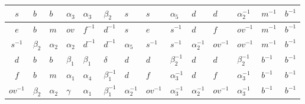 \documentclass{llncs}
\begin{document}
\begin{table}[h]
\begin{center}
\begin{tabular}{|c|p{0.7cm}|p{0.7cm}|p{0.7cm}|p{0.7cm}|p{0.7cm}|p{0.7cm}|p{0.7cm}|p{0.7cm}|p{0.7cm}|p{0.7cm}|p{0.7cm}|p{0.7cm}|p{0.7cm}|}
\hline
\cellcolor{gray!8}$s$ & \cellcolor{blue!20}$b$ & \cellcolor{blue!20}$b$ & \cellcolor{blue!20}$\alpha_3$ & \cellcolor{blue!20}$\alpha_3$ & {\cellcolor{blue!20}$\beta_2$} & \cellcolor{blue!20}$s$ & \cellcolor{blue!20}$s$ & $\alpha_5$ & \cellcolor{yellow!30}$d$ & \cellcolor{yellow!30}$d$ & \cellcolor{yellow!30}$\alpha_2^{-1}$ & \cellcolor{yellow!30}$m^{-1}$ &  \cellcolor{yellow!30}$b^{-1}$ \\
\hline
\cellcolor{gray!8}$e$ & \cellcolor{blue!20}$b$ & \cellcolor{blue!20}$m$ & \cellcolor{blue!20}$ov$ & \cellcolor{blue!20}$f^{-1}$ & \cellcolor{blue!20}$d^{-1}$ & \cellcolor{blue!20}$s$ & $e$ & \cellcolor{yellow!30}$s^{-1}$ & \cellcolor{yellow!30}$d$ & \cellcolor{yellow!30}$f$ & \cellcolor{yellow!30}$ov^{-1}$ & \cellcolor{yellow!30}$m^{-1}$ & \cellcolor{yellow!30}$b^{-1}$ \\
\hline
\cellcolor{gray!8}$s^{-1}$ &\cellcolor{blue!20}$\beta_2$ & \cellcolor{blue!20}$\alpha_2$ & \cellcolor{blue!20}$\alpha_2$ & \cellcolor{blue!20}$d^{-1}$ & \cellcolor{blue!20}$d^{-1}$ & $\alpha_5$ & \cellcolor{yellow!30}$s^{-1}$ & \cellcolor{yellow!30}$s^{-1}$ & \cellcolor{yellow!30}$\alpha_2^{-1}$ & \cellcolor{yellow!30}$ov^{-1}$ & \cellcolor{yellow!30}$ov^{-1}$ & \cellcolor{yellow!30}$m^{-1}$ & \cellcolor{yellow!30}$b^{-1}$ \\
\hline
\cellcolor{gray!8}$d$ & \cellcolor{blue!20}$b$ & \cellcolor{blue!20}$b$ & \cellcolor{blue!20}$\beta_1$ & \cellcolor{blue!20}$\beta_1$ & $\delta$ & \cellcolor{yellow!30}$d$ & \cellcolor{yellow!30}$d$ & \cellcolor{yellow!30}$\beta_2^{-1}$ & \cellcolor{yellow!30}$d$ & \cellcolor{yellow!30}$d$ & \cellcolor{yellow!30}$\beta_2^{-1}$ & \cellcolor{yellow!30}$b^{-1}$ &\cellcolor{yellow!30} $b^{-1}$ \\
\hline
\cellcolor{gray!8}$f$ & \cellcolor{blue!20}$b$ & \cellcolor{blue!20}$m$ & \cellcolor{blue!20}$\alpha_1$ & $\alpha_4$ & \cellcolor{yellow!30}$\beta_1^{-1}$ & \cellcolor{yellow!30}$d$ & \cellcolor{yellow!30}$f$ & \cellcolor{yellow!30}$\alpha_3^{-1}$ & \cellcolor{yellow!30}$d$ & \cellcolor{yellow!30}$f$ & \cellcolor{yellow!30}$\alpha_3^{-1}$ & \cellcolor{yellow!30}$b^{-1}$ & \cellcolor{yellow!30}$b^{-1}$ \\
\hline
\cellcolor{gray!8}$ov^{-1}$ & \cellcolor{blue!20}$\beta_2$ & \cellcolor{blue!20}$\alpha_2$ & $\gamma$ & \cellcolor{yellow!30}$\alpha_1$ & \cellcolor{yellow!30}$\beta_1^{-1}$ & \cellcolor{yellow!30}$\alpha_2^{-1}$ & \cellcolor{yellow!30}$ov^{-1}$ & \cellcolor{yellow!30}$\alpha_3^{-1}$ & \cellcolor{yellow!30}$\alpha_2^{-1}$ & \cellcolor{yellow!30}$ov^{-1}$ & \cellcolor{yellow!30}$\alpha_3^{-1}$ & \cellcolor{yellow!30}$b^{-1}$ & \cellcolor{yellow!30} $b^{-1}$ \\

\end{tabular}
\end{center}
\end{table}
\end{document}
